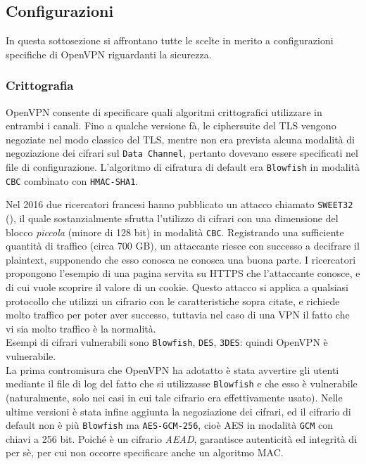 \subsection{Configurazioni}
In questa sottosezione si affrontano tutte le scelte in merito a configurazioni
specifiche
di OpenVPN riguardanti la sicurezza.

\subsubsection{Crittografia}
OpenVPN consente di specificare quali algoritmi crittografici utilizzare in entrambi i canali.
Fino a qualche versione fà, le ciphersuite del TLS vengono negoziate nel
modo classico del TLS, mentre non era prevista alcuna modalità di negoziazione
dei cifrari sul \texttt{Data Channel}, pertanto dovevano essere specificati
nel file di configurazione. L'algoritmo di cifratura di default era \texttt{Blowfish}
in modalità \texttt{CBC} combinato con \texttt{HMAC-SHA1}.

Nel 2016 due ricercatori francesi hanno pubblicato un attacco chiamato \texttt{SWEET32} (\cite{BL16:Sweet32}),
il quale sostanzialmente sfrutta l'utilizzo di cifrari con una dimensione del blocco
\textit{piccola} (minore di 128 bit) in modalità \texttt{CBC}. Registrando
una sufficiente quantità di traffico (circa 700 GB), un attaccante riesce con successo
a decifrare il plaintext, supponendo che esso conosca ne conosca una buona parte.
I ricercatori propongono l'esempio di una pagina servita su HTTPS che l'attaccante
conosce, e di cui vuole scoprire il valore di un cookie. Questo attacco si applica
a qualsiasi protocollo che utilizzi un cifrario con le caratteristiche sopra citate, e richiede
molto traffico per poter aver successo, tuttavia nel caso di una VPN il fatto che
vi sia molto traffico è la normalità.\\
Esempi di cifrari vulnerabili sono \texttt{Blowfish}, \texttt{DES}, \texttt{3DES}: quindi
OpenVPN è vulnerabile.\\
La prima contromisura che OpenVPN ha adotatto è stata
avvertire gli utenti mediante il file di log del fatto che si utilizzasse \texttt{Blowfish} e che
esso è vulnerabile (naturalmente, solo nei casi in cui tale cifrario era effettivamente
usato). Nelle ultime versioni è stata infine
aggiunta la negoziazione dei cifrari, ed il cifrario di default non è più
\texttt{Blowfish} ma \texttt{AES-GCM-256}, cioè AES in modalità \texttt{GCM} con
chiavi a 256 bit. Poiché è un cifrario \textit{AEAD}, garantisce autenticità ed
integrità di per sè, per cui non occorre specificare anche un algoritmo MAC.

